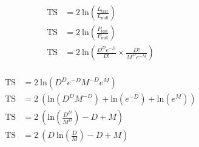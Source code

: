 
  \begin{equation}
    \begin{split}
      \textrm{TS} & = 2 \: \textrm{ln} \left ( \frac{ L_{\textrm{test}} }{ L_{\textrm{null}}    } \right ) \\
      \textrm{TS} & = 2 \: \textrm{ln} \left ( \frac{ P_{\textrm{test}} }{ P_{\textrm{null}}    } \right ) \\
      \textrm{TS} & = 2 \: \textrm{ln} \left ( \frac{D^D e^{-D}}{D!} \times \frac{D!}{M^D e^{-M}} \right ) \\
    \end{split}
  \end{equation}
  
  \begin{equation}
    \begin{split}
      \textrm{TS} & = 2 \: \textrm{ln} \left ( D^D e^{-D} M^{-D} e^M                              \right ) \\
      \textrm{TS} & = 2 \: \left (      \textrm{ln} \left ( D^D M^{-D} \right ) + \textrm{ln} \left ( e^{-D} \right ) + \textrm{ln} \left ( e^M  \right )\right ) \\
      \textrm{TS} & = 2 \: \left (      \textrm{ln} \left (  \frac{D^D}{M^D} \right ) -D + M \right ) \\
      \textrm{TS} & = 2 \: \left ( D \: \textrm{ln} \left (  \frac{D  }{M  } \right ) -D + M \right )
    \end{split}
  \end{equation}
  
